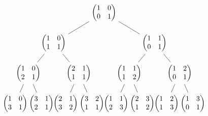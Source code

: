 \documentclass{article}
\begin{document}
$$\begin{tikzpicture}[level distance=15mm, 
                    level 1/.style={sibling distance=50mm},
                    level 2/.style={sibling distance=25mm},
                    level 3/.style={sibling distance=13mm}]
  \node {\(\begin{pmatrix}1 & 0 \\ 0 & 1\end{pmatrix}\)}
    child {
      node {\(\begin{pmatrix}1 & 0 \\ 1 & 1\end{pmatrix}\)} 
      child {
        node {\(\begin{pmatrix}1 & 0 \\ 2 & 1\end{pmatrix}\)}
        child {node {\(\begin{pmatrix}1 & 0 \\ 3 & 1\end{pmatrix}\)}}
        child {node {\(\begin{pmatrix}3 & 1 \\ 2 & 1\end{pmatrix}\)}}
      }
      child {
        node {\(\begin{pmatrix}2 & 1 \\ 1 & 1\end{pmatrix}\)}
        child {node {\(\begin{pmatrix}2 & 1 \\ 3 & 2\end{pmatrix}\)}}
        child {node {\(\begin{pmatrix}3 & 2 \\ 1 & 1\end{pmatrix}\)}}
      }
    }
    child {
      node {\(\begin{pmatrix}1 & 1 \\ 0 & 1\end{pmatrix}\)}
      child {
        node {\(\begin{pmatrix}1 & 1 \\ 1 & 2\end{pmatrix}\)}
        child {node {\(\begin{pmatrix}1 & 1 \\ 2 & 3\end{pmatrix}\)}}
        child {node {\(\begin{pmatrix}2 & 3 \\ 1 & 2\end{pmatrix}\)}}
      }
      child {
        node {\(\begin{pmatrix}1 & 2 \\ 0 & 1\end{pmatrix}\)}
        child {node {\(\begin{pmatrix}1 & 2 \\ 1 & 3\end{pmatrix}\)}}
        child {node {\(\begin{pmatrix}1 & 3 \\ 0 & 1\end{pmatrix}\)}}
      } 
    };
\end{tikzpicture}$$
\end{document}
